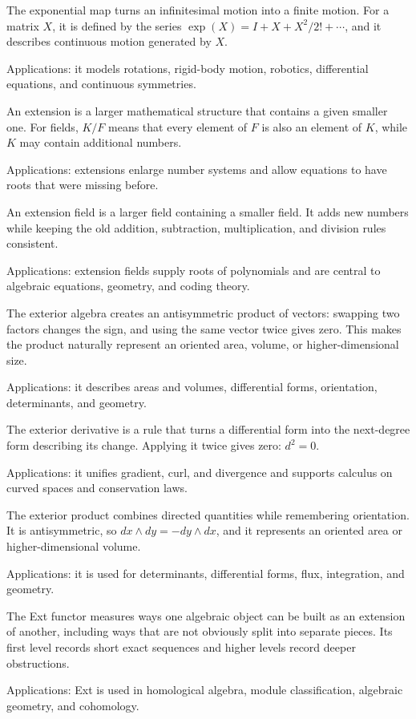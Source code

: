The exponential map turns an infinitesimal motion into a finite motion. For a matrix $X$, it is defined by the series $\exp(X)=I+X+X^2/2!+\cdots$, and it describes continuous motion generated by $X$. \par\noindent Applications: it models rotations, rigid-body motion, robotics, differential equations, and continuous symmetries.

An extension is a larger mathematical structure that contains a given smaller one. For fields, $K/F$ means that every element of $F$ is also an element of $K$, while $K$ may contain additional numbers. \par\noindent Applications: extensions enlarge number systems and allow equations to have roots that were missing before.

An extension field is a larger field containing a smaller field. It adds new numbers while keeping the old addition, subtraction, multiplication, and division rules consistent. \par\noindent Applications: extension fields supply roots of polynomials and are central to algebraic equations, geometry, and coding theory.

The exterior algebra creates an antisymmetric product of vectors: swapping two factors changes the sign, and using the same vector twice gives zero. This makes the product naturally represent an oriented area, volume, or higher-dimensional size. \par\noindent Applications: it describes areas and volumes, differential forms, orientation, determinants, and geometry.

The exterior derivative is a rule that turns a differential form into the next-degree form describing its change. Applying it twice gives zero: $d^2=0$. \par\noindent Applications: it unifies gradient, curl, and divergence and supports calculus on curved spaces and conservation laws.

The exterior product combines directed quantities while remembering orientation. It is antisymmetric, so $dx\wedge dy=-dy\wedge dx$, and it represents an oriented area or higher-dimensional volume. \par\noindent Applications: it is used for determinants, differential forms, flux, integration, and geometry.

The Ext functor measures ways one algebraic object can be built as an extension of another, including ways that are not obviously split into separate pieces. Its first level records short exact sequences and higher levels record deeper obstructions. \par\noindent Applications: Ext is used in homological algebra, module classification, algebraic geometry, and cohomology.


